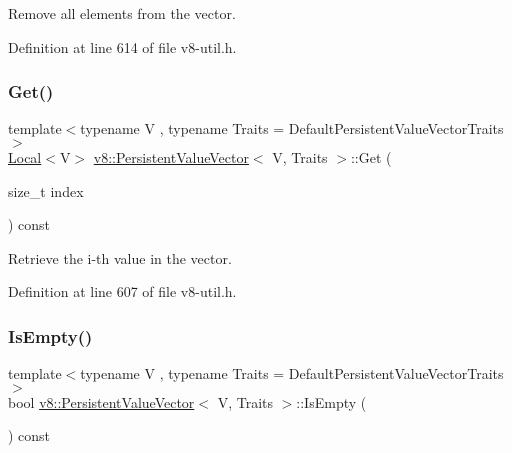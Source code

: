 Remove all elements from the vector. 

Definition at line 614 of file v8-\/util.\+h.

\mbox{\label{classv8_1_1PersistentValueVector_a0788f334c7f61355863244379042ce76}} 
\subsubsection{\texorpdfstring{Get()}{Get()}}
{\footnotesize\ttfamily template$<$typename V , typename Traits  = Default\+Persistent\+Value\+Vector\+Traits$>$ \\
\mbox{\hyperlink{classv8_1_1Local}{Local}}$<$V$>$ \mbox{\hyperlink{classv8_1_1PersistentValueVector}{v8\+::\+Persistent\+Value\+Vector}}$<$ V, Traits $>$\+::Get (\begin{DoxyParamCaption}\item[{size\+\_\+t}]{index }\end{DoxyParamCaption}) const\hspace{0.3cm}{\ttfamily [inline]}}

Retrieve the i-\/th value in the vector. 

Definition at line 607 of file v8-\/util.\+h.

\mbox{\label{classv8_1_1PersistentValueVector_aa45dd4d1ee94a2c199a28a0bb2e432f1}} 
\subsubsection{\texorpdfstring{Is\+Empty()}{IsEmpty()}}
{\footnotesize\ttfamily template$<$typename V , typename Traits  = Default\+Persistent\+Value\+Vector\+Traits$>$ \\
bool \mbox{\hyperlink{classv8_1_1PersistentValueVector}{v8\+::\+Persistent\+Value\+Vector}}$<$ V, Traits $>$\+::Is\+Empty (\begin{DoxyParamCaption}{ }\end{DoxyParamCaption}) const\hspace{0.3cm}{\ttfamily [inline]}}

